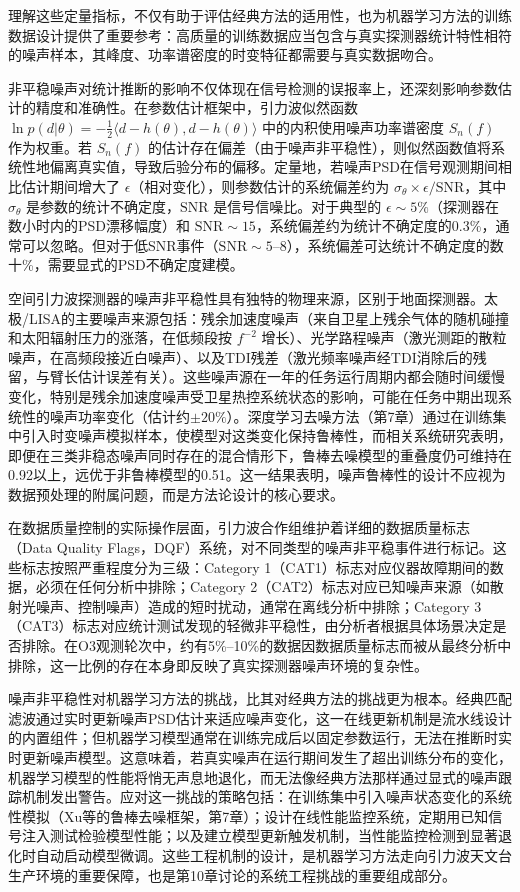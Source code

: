理解这些定量指标，不仅有助于评估经典方法的适用性，也为机器学习方法的训练数据设计提供了重要参考：高质量的训练数据应当包含与真实探测器统计特性相符的噪声样本，其峰度、功率谱密度的时变特征都需要与真实数据吻合。

非平稳噪声对统计推断的影响不仅体现在信号检测的误报率上，还深刻影响参数估计的精度和准确性。在参数估计框架中，引力波似然函数 $\ln p(d|\theta) = -\frac{1}{2}\langle d-h(\theta), d-h(\theta)\rangle$ 中的内积使用噪声功率谱密度 $S_n(f)$ 作为权重。若 $S_n(f)$ 的估计存在偏差（由于噪声非平稳性），则似然函数值将系统性地偏离真实值，导致后验分布的偏移。定量地，若噪声PSD在信号观测期间相比估计期间增大了 $\epsilon$（相对变化），则参数估计的系统偏差约为 $\sigma_\theta \times \epsilon/\mathrm{SNR}$，其中 $\sigma_\theta$ 是参数的统计不确定度，$\mathrm{SNR}$ 是信号信噪比。对于典型的 $\epsilon \sim 5\%$（探测器在数小时内的PSD漂移幅度）和 $\mathrm{SNR} \sim 15$，系统偏差约为统计不确定度的0.3\%，通常可以忽略。但对于低SNR事件（$\mathrm{SNR} \sim 5$--$8$），系统偏差可达统计不确定度的数十\%，需要显式的PSD不确定度建模。

空间引力波探测器的噪声非平稳性具有独特的物理来源，区别于地面探测器。太极/LISA的主要噪声来源包括：残余加速度噪声（来自卫星上残余气体的随机碰撞和太阳辐射压力的涨落，在低频段按 $f^{-2}$ 增长）、光学路程噪声（激光测距的散粒噪声，在高频段接近白噪声）、以及TDI残差（激光频率噪声经TDI消除后的残留，与臂长估计误差有关）。这些噪声源在一年的任务运行周期内都会随时间缓慢变化，特别是残余加速度噪声受卫星热控系统状态的影响，可能在任务中期出现系统性的噪声功率变化（估计约$\pm 20\%$）。深度学习去噪方法（第7章）通过在训练集中引入时变噪声模拟样本，使模型对这类变化保持鲁棒性，而相关系统研究表明，即便在三类非稳态噪声同时存在的混合情形下，鲁棒去噪模型的重叠度仍可维持在0.92以上，远优于非鲁棒模型的0.51。这一结果表明，噪声鲁棒性的设计不应视为数据预处理的附属问题，而是方法论设计的核心要求。

在数据质量控制的实际操作层面，引力波合作组维护着详细的数据质量标志（Data Quality Flags，DQF）系统，对不同类型的噪声非平稳事件进行标记。这些标志按照严重程度分为三级：Category 1（CAT1）标志对应仪器故障期间的数据，必须在任何分析中排除；Category 2（CAT2）标志对应已知噪声来源（如散射光噪声、控制噪声）造成的短时扰动，通常在离线分析中排除；Category 3（CAT3）标志对应统计测试发现的轻微非平稳性，由分析者根据具体场景决定是否排除。在O3观测轮次中，约有5\%--10\%的数据因数据质量标志而被从最终分析中排除，这一比例的存在本身即反映了真实探测器噪声环境的复杂性。

噪声非平稳性对机器学习方法的挑战，比其对经典方法的挑战更为根本。经典匹配滤波通过实时更新噪声PSD估计来适应噪声变化，这一在线更新机制是流水线设计的内置组件；但机器学习模型通常在训练完成后以固定参数运行，无法在推断时实时更新噪声模型。这意味着，若真实噪声在运行期间发生了超出训练分布的变化，机器学习模型的性能将悄无声息地退化，而无法像经典方法那样通过显式的噪声跟踪机制发出警告。应对这一挑战的策略包括：在训练集中引入噪声状态变化的系统性模拟（Xu等的鲁棒去噪框架，第7章）；设计在线性能监控系统，定期用已知信号注入测试检验模型性能；以及建立模型更新触发机制，当性能监控检测到显著退化时自动启动模型微调。这些工程机制的设计，是机器学习方法走向引力波天文台生产环境的重要保障，也是第10章讨论的系统工程挑战的重要组成部分。

